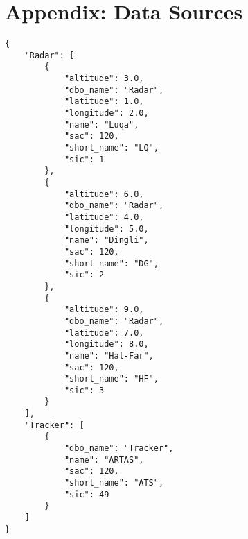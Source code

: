 \section{Appendix: Data Sources}
\label{sec:appendix_data_sources}


\begin{lstlisting}
{
    "Radar": [
        {
            "altitude": 3.0,
            "dbo_name": "Radar",
            "latitude": 1.0,
            "longitude": 2.0,
            "name": "Luqa",
            "sac": 120,
            "short_name": "LQ",
            "sic": 1
        },
        {
            "altitude": 6.0,
            "dbo_name": "Radar",
            "latitude": 4.0,
            "longitude": 5.0,
            "name": "Dingli",
            "sac": 120,
            "short_name": "DG",
            "sic": 2
        },
        {
            "altitude": 9.0,
            "dbo_name": "Radar",
            "latitude": 7.0,
            "longitude": 8.0,
            "name": "Hal-Far",
            "sac": 120,
            "short_name": "HF",
            "sic": 3
        }
    ],
    "Tracker": [
        {
            "dbo_name": "Tracker",
            "name": "ARTAS",
            "sac": 120,
            "short_name": "ATS",
            "sic": 49
        }
    ]
}
\end{lstlisting}
